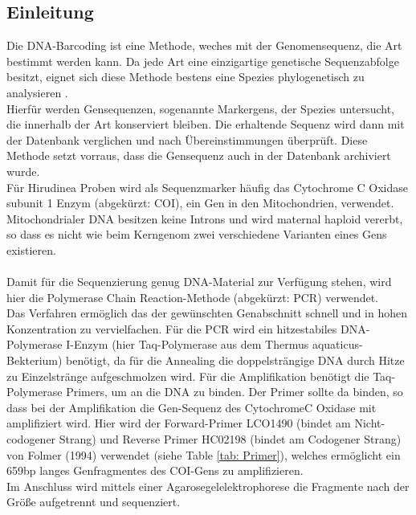 \documentclass[oneside,10pt,a4paper]{report}
\begin{document}
			\subsection{Einleitung}
				Die DNA-Barcoding ist eine Methode, weches mit der Genomensequenz, die Art bestimmt werden kann.
				Da jede Art eine einzigartige genetische Sequenzabfolge besitzt, eignet sich diese Methode bestens eine Spezies phylogenetisch zu analysieren\cite{Folmer} \cite{Herbert}.\\
				Hierfür werden Gensequenzen, sogenannte Markergens, der Spezies untersucht, die innerhalb der Art konserviert bleiben.
				Die erhaltende Sequenz wird dann mit der Datenbank verglichen und nach Übereinstimmungen überprüft. Diese Methode setzt vorraus, dass die Gensequenz auch in der Datenbank archiviert wurde.\\
				Für Hirudinea Proben wird als Sequenzmarker häufig das  Cytochrome C Oxidase subunit 1 Enzym (abgekürzt: COI), ein Gen in den Mitochondrien, verwendet\cite{Folmer}. Mitochondrialer DNA besitzen keine Introns und wird maternal haploid vererbt, so dass es nicht wie beim Kerngenom zwei verschiedene Varianten eines Gens existieren.\\
				\\
				Damit für die Sequenzierung genug DNA-Material zur Verfügung stehen, wird hier die Polymerase Chain Reaction-Methode (abgekürzt: PCR) verwendet.\\
				Das Verfahren ermöglich das der gewünschten Genabschnitt schnell und in hohen Konzentration zu vervielfachen.
				Für die PCR wird ein hitzestabiles DNA-Polymerase I-Enzym (hier Taq-Polymerase aus dem Thermus aquaticus-Bekterium) benötigt, da für die Annealing die doppelsträngige DNA durch Hitze zu Einzelstränge aufgeschmolzen wird.
				Für die Amplifikation benötigt die Taq-Polymerase Primers, um an die DNA zu binden. Der Primer sollte da binden, so dass bei der Amplifikation die Gen-Sequenz des CytochromeC Oxidase mit amplifiziert wird.
				Hier wird der Forward-Primer LCO1490 (bindet am Nicht-codogener Strang) und Reverse Primer HC02198 (bindet am Codogener Strang) von Folmer (1994) verwendet (siehe Table \ref{tab: Primer}), welches ermöglicht ein 659bp langes Genfragmentes des COI-Gens zu amplifizieren.\\
				Im Anschluss wird mittels einer Agarosegelelektrophorese die Fragmente nach der Größe aufgetrennt und sequenziert.\\
				
			
\end{document}
